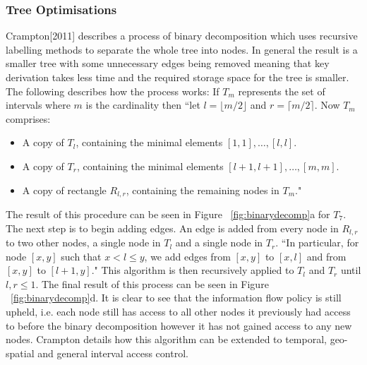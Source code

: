 \documentclass[12pt, titlepage]{article}
\begin{document}
\subsubsection{Tree Optimisations}
Crampton[2011]\cite{mainPaper} describes a process of binary decomposition which uses recursive labelling methods to separate the whole tree into nodes. In general the result is a smaller tree with some unnecessary edges being removed meaning that key derivation takes less time and the required storage space for the tree is smaller. The following describes how the process works:
\newline \indent If $T_{m}$ represents the set of intervals where $m$ is the cardinality then ``let $l = \lfloor m/2 \rfloor$ and $r = \lceil m/2 \rceil$. Now $T_{m}$ comprises:
\begin{itemize}
\item A copy of $T_{l}$, containing the minimal elements $[1, 1], \dots , [l,l]$.
\item A copy of $T_{r}$, containing the minimal elements $[l + 1, l + 1], \dots , [m, m]$.
\item A copy of rectangle $R_{l,r}$, containing the remaining nodes in $T_{m}$."
\end{itemize}
The result of this procedure can be seen in Figure ~\ref{fig:binarydecomp}a for $T_{7}$.
\newline The next step is to begin adding edges. An edge is added from every node in $R_{l,r}$ to two other nodes, a single node in $T_{l}$ and a single node in $T_{r}$. ``In particular, for node $[x, y]$ such that $x<l≤y$, we add edges from $[x, y]$ to $[x, l]$ and from $[x, y]$ to $[l + 1, y]$."
\newline This algorithm is then recursively applied to $T_{l}$ and $T_{r}$ until $l, r ≤ 1$. The final result of this process can be seen in Figure ~\ref{fig:binarydecomp}d.
\newline \indent It is clear to see that the information flow policy is still upheld, i.e. each node still has access to all other nodes it previously had access to before the binary decomposition however it has not gained access to any new nodes.
\newline \indent Crampton details how this algorithm can be extended to temporal, geo-spatial and general interval access control.
\end{document}
